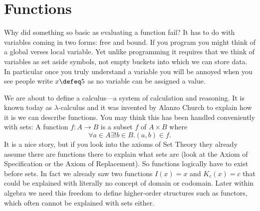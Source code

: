 \section{Functions}






Why did something so basic as evaluating a function fail?  It has to do with
variables coming in two forms: free and bound.  If you program you might think
of a global verses local variable.  Yet unlike programming it requires that we
think of variables as set aside symbols, not empty buckets into which we can
store data.  In particular once you truly understand a variable you will be 
annoyed when you see people write $x\defeq 5$ as no variable can be assigned 
a value.

We are about to define a calculus---a system of calculation and reasoning.
It is known today as $\lambda$-calculus and it was invented by Alanzo Church 
to explain how it is we can describe functions.  You may think this has been 
handled conveniently with sets: A function $f:A\to B$ is a subset $f$ of $A\times B$ where 
\[
    \forall a\in A\exists! b\in B.(a,b)\in f.
\]
It is a nice story, but if you look into the axioms of Set Theory they already
assume there are functions there to explain what sets are (look at the Axiom of
Specification or the Axiom of Replacement).  So functions logically have to exist
before sets.  In fact we already saw two functions $I(x)=x$ and $K_c(x)=c$ that
could be explained with literally no concept of domain or codomain.  Later
within algebra we need this freedom to define higher-order structures such as
functors, which often cannot be explained with sets either.

